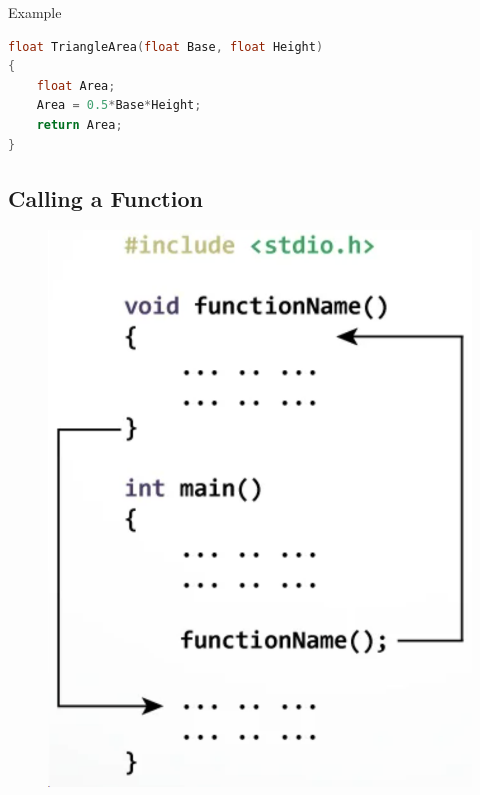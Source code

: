 Example

\begin{lstlisting}[language=c]
float TriangleArea(float Base, float Height)
{
	float Area;
	Area = 0.5*Base*Height;
	return Area;
}
\end{lstlisting}


\subsection{Calling a Function}

\begin{figure}[H]
    \centering
    \includegraphics[width=0.45\linewidth]{P3/img/screenshot005.png}
    \caption{}
    \label{fig:memanggilfungsi}
\end{figure}

